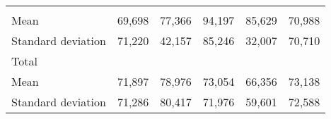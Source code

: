 \begin{tabular}{llllll}
  \multicolumn{1}{|r}{} &
  \multicolumn{1}{r}{} &
  \multicolumn{1}{r}{} &
  \multicolumn{1}{r}{} &
  \multicolumn{1}{r}{} \\
\multicolumn{1}{l}{\hspace{4em}Mean} &
  \multicolumn{1}{|r}{69,698} &
  \multicolumn{1}{r}{77,366} &
  \multicolumn{1}{r}{94,197} &
  \multicolumn{1}{r}{85,629} &
  \multicolumn{1}{r}{70,988} \\
\multicolumn{1}{l}{\hspace{4em}Standard deviation} &
  \multicolumn{1}{|r}{71,220} &
  \multicolumn{1}{r}{42,157} &
  \multicolumn{1}{r}{85,246} &
  \multicolumn{1}{r}{32,007} &
  \multicolumn{1}{r}{70,710} \\
\multicolumn{1}{l}{\hspace{3em}Total} &
  \multicolumn{1}{|r}{} &
  \multicolumn{1}{r}{} &
  \multicolumn{1}{r}{} &
  \multicolumn{1}{r}{} &
  \multicolumn{1}{r}{} \\
\multicolumn{1}{l}{\hspace{4em}Mean} &
  \multicolumn{1}{|r}{71,897} &
  \multicolumn{1}{r}{78,976} &
  \multicolumn{1}{r}{73,054} &
  \multicolumn{1}{r}{66,356} &
  \multicolumn{1}{r}{73,138} \\
\multicolumn{1}{l}{\hspace{4em}Standard deviation} &
  \multicolumn{1}{|r}{71,286} &
  \multicolumn{1}{r}{80,417} &
  \multicolumn{1}{r}{71,976} &
  \multicolumn{1}{r}{59,601} &
  \multicolumn{1}{r}{72,588} \\
\cline{1-6}
\end{tabular}


